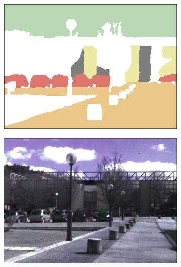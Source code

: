 \begin{figure}[!htb]
\begin{minipage}{0.48\textwidth}
\begin{subfigure}[b]{0.3\linewidth}
			\includegraphics[width=\linewidth]{Figures/VISAPP/49gt.png}
		\end{subfigure}
		\begin{subfigure}[b]{0.3\linewidth}
			\includegraphics[width=\linewidth]{Figures/VISAPP/2int.png}
		\end{subfigure}\\
		\begin{subfigure}[b]{0.3\linewidth}

\end{subfigure}
\end{minipage}
\end{figure}
